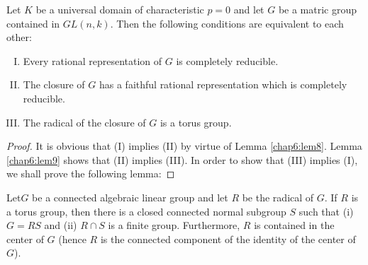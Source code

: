 \medskip
{}

\begin{thm}\label{chap6:thm3}%
  Let $K$ be a universal domain of characteristic $p=0$ and let $G$
  be a matric group contained in $GL(n,k)$. Then the following
  conditions are equivalent to each other: 
\begin{enumerate}[(I)]
\item Every rational representation of $G$ is completely reducible.

\item The closure of $G$ has a faithful rational representation which
  is completely reducible. 

\item  The radical of the closure of $G$ is a torus group.
\end{enumerate}
\end{thm}

\begin{proof}
  It is obvious that (I) implies (II) by virtue of Lemma
  \ref{chap6:lem8}. Lemma \ref{chap6:lem9} shows that (II) implies
  (III). In order to show 
  that (III) implies (I),  we shall prove the following lemma: 
\end{proof}

\begin{lem}\label{chap6:lem10}%
  Let\pageoriginale $G$ be a connected algebraic linear group and let
  $R$ be the radical 
  of $G$. If $R$ is a torus group, then there is a closed connected normal
  subgroup $S$ such that (i) $G= RS$ and (ii) $R \cap S$ is a finite
  group. Furthermore, $R$ is contained in the center of $G$ (hence $R$
  is the connected component of the identity of the center of $G$). 
\end{lem}

